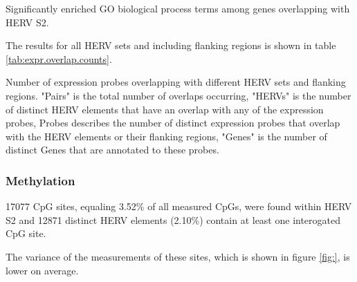 \documentclass[a4paper,12pt]{article}
\begin{document}
\begin{table}[h!]
  \begin{center}
  \end{center}        
	\caption{Significantly enriched GO biological process terms among genes overlapping with HERV S2.}
	\label{tab:expr.overlap.counts}
\end{table}

The results for all HERV sets and including flanking regions is shown in table \ref{tab:expr.overlap.counts}.



\begin{table}[h!]
  \begin{center}
  \end{center}        
	\caption{Number of expression probes overlapping with different HERV sets and flanking regions. "Pairs" is the total number of overlaps occurring, "HERVs" is the number of distinct HERV elements that have an overlap with any of the expression probes, Probes describes the number of distinct expression probes that overlap with the HERV elements or their flanking regions, "Genes" is the number of distinct Genes that are annotated to these probes.}
	\label{tab:expr.overlap.counts}
\end{table}

\subsubsection{Methylation}
17077 CpG sites, equaling 3.52\% of all measured CpGs, were found within HERV S2 and 12871 distinct HERV elements (2.10\%) contain at least one interogated CpG site.


The variance of the measurements of these sites, which is shown in figure \ref{fig:}, is lower on average.
\end{document}
